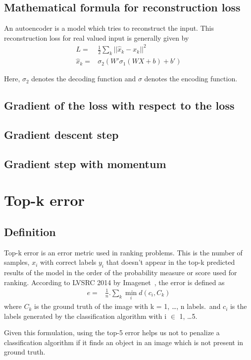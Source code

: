 \documentclass{article}
\begin{document}
\subsection{Mathematical formula for reconstruction loss}
An autoencoder is a model which tries to reconstruct the input.  This reconstruction loss for real valued input is generally given by 
\begin{align*}
  L =& \frac{1}{2} \sum_{k}{\lvert\lvert \hat{x}_{k} - x_{k} \rvert\rvert}^{2} \\
  \hat{x}_{k} =& \sigma_{2}(W'\sigma_{1}(WX + b) + b')
\end{align*}

Here, $\sigma_{2} $ denotes the decoding function and $ \sigma $ denotes the encoding function.
\subsection{Gradient of the loss with respect to the loss}
\subsection{Gradient descent step}
\subsection{Gradient step with momentum}

\section{Top-k error}
\subsection{Definition}
Top-k error is an error metric used in ranking problems.  
This is the number of samples, $x_{i}$ with correct labels $ y_{i} $ that doesn't appear in the top-k predicted results of the model in the order of the probability measure or score used for ranking.  
According to LVSRC 2014 by Imagenet~\cite{ILSVRC15}, the error is defined as
\begin{align*}
  e =& \frac{1}{n}. \sum_{k} \min_{i} d(c_{i}, C_{k})
\end{align*}
where $C_{k}$ is the ground truth of the image with k = 1, \ldots, n labels.\ 
and $c_{i}$ is the labels generated by the classification algorithm with i $\in$ 1, \ldots 5.

Given this formulation, using the top-5 error helps us not to penalize a classification algorithm if it finds an object in an image which is not present in ground truth.
\end{document}
